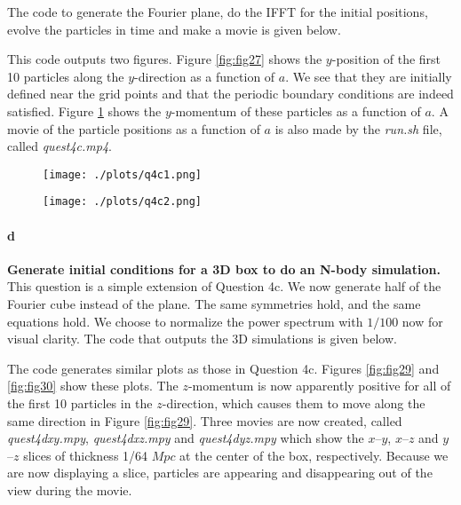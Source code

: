 The code to generate the Fourier plane, do the IFFT for the initial positions, evolve the particles in time and make a movie is given below.




This code outputs two figures. Figure \ref{fig:fig27} shows the $y$-position of the first 10 particles along the $y$-direction as a function of $a$. We see that they are initially defined near the grid points and that the periodic boundary conditions are indeed satisfied. Figure \ref{fig:fig28} shows the $y$-momentum of these particles as a function of $a$. A movie of the particle positions as a function of $a$ is also made by the \textit{run.sh} file, called \textit{quest4c.mp4}.

\begin{figure}[ht]\centering
\begin{minipage}[t]{.5\textwidth}
\centering
\texttt{[image: ./plots/q4c1.png]}
\captionsetup{width=0.8\linewidth}
\label{fig:fig27}
\end{minipage}%
\begin{minipage}[t]{.5\textwidth}
\centering
\texttt{[image: ./plots/q4c2.png]}
\captionsetup{width=0.8\linewidth}
\label{fig:fig28}
\end{minipage}%
\end{figure}


\paragraph{d} \textbf{Generate initial conditions for a 3D box to do an N-body simulation.}
This question is a simple extension of Question 4c. We now generate half of the Fourier cube instead of the plane. The same symmetries hold, and the same equations hold. We choose to normalize the power spectrum with $1/100$ now for visual clarity. The code that outputs the 3D simulations is given below.


The code generates similar plots as those in Question 4c. Figures \ref{fig:fig29} and \ref{fig:fig30} show these plots. The $z$-momentum is now apparently positive for all of the first 10 particles in the $z$-direction, which causes them to move along the same direction in Figure \ref{fig:fig29}. Three movies are now created, called \textit{quest4dxy.mpy}, \textit{quest4dxz.mpy} and \textit{quest4dyz.mpy} which show the $x$--$y$, $x$--$z$ and $y$--$z$ slices of thickness 1/64 $Mpc$ at the center of the box, respectively. Because we are now displaying a slice, particles are appearing and disappearing out of the view during the movie.


